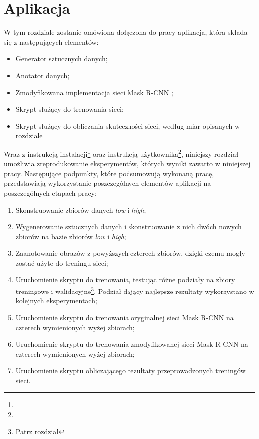 \chapter{Aplikacja}
\label{sec:aplikacja}
W tym rozdziale zostanie omówiona dołączona do pracy aplikacja, która składa się z następujących elementów:
\begin{itemize}
  \item Generator sztucznych danych;
  \item Anotator danych;
  \item Zmodyfikowana implementacja sieci Mask R-CNN \cite{matterport-mask-rcnn};
  \item Skrypt służący do trenowania sieci;
  \item Skrypt służący do obliczania skuteczności sieci, według miar opisanych w rozdziale 
\end{itemize}

Wraz z instrukcją instalacji\footnote{} oraz instrukcją użytkownika\footnote{}, niniejszy rozdział umożliwia zreprodukowanie eksperymentów, których wyniki zawarto w niniejszej pracy.
Następujące podpunkty, które podsumowują wykonaną pracę, przedstawiają wykorzystanie poszczególnych elementów aplikacji na poszczególnych etapach pracy:

\begin{enumerate}
 \item Skonstruowanie zbiorów danych \textit{low} i \textit{high};
 \item Wygenerowanie sztucznych danych i skonstruowanie z nich dwóch nowych zbiorów na bazie zbiorów \textit{low} i \textit{high};
 \item Zaanotowanie obrazów z powyższych czterech zbiorów, dzięki czemu mogły zostać użyte do treningu sieci;
 \item Uruchomienie skryptu do trenowania, testując różne podziały na zbiory treningowe i walidacyjne\footnote{Patrz rozdział }. Podział dający najlepsze rezultaty wykorzystano w kolejnych eksperymentach;
 \item Uruchomienie skryptu do trenowania oryginalnej sieci Mask R-CNN na czterech wymienionych wyżej zbiorach;
 \item Uruchomienie skryptu do trenowania zmodyfikowanej sieci Mask R-CNN na czterech wymienionych wyżej zbiorach;
 \item Uruchomienie skryptu obliczającego rezultaty przeprowadzonych treningów sieci.
\end{enumerate}



